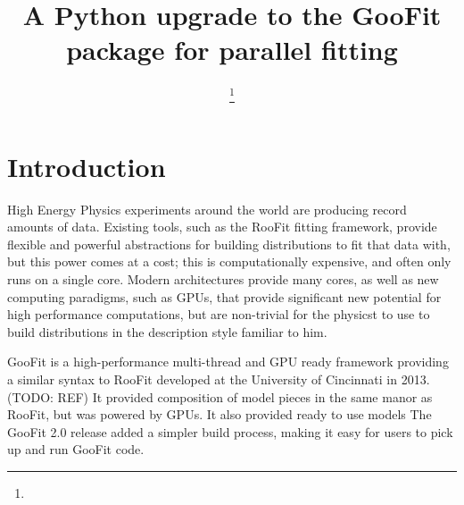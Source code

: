 \documentclass{webofc}
\begin{document}
%
\title{A Python upgrade to the GooFit package for parallel fitting}

\author{
        \fnsep\thanks{}
        \and
        \and 
        \and
        \and 
        \and 
}        %


%
\maketitle
%
\section{Introduction}
\label{intro}
High Energy Physics experiments around the world are producing record amounts of data. Existing tools, such as the RooFit fitting framework, provide flexible and powerful abstractions for building distributions to fit that data with, but this power comes at a cost; this is computationally expensive, and often only runs on a single core. Modern architectures provide many cores, as well as new computing paradigms, such as GPUs, that provide significant new potential for high performance computations, but are non-trivial for the physicst to use to build distributions in the description style familiar to him.

GooFit is a high-performance multi-thread and GPU ready framework providing a similar syntax to RooFit developed at the University of Cincinnati in 2013. (TODO: REF) It provided composition of model pieces in the same manor as RooFit, but was powered by GPUs. It also provided ready to use models The GooFit 2.0 release added a simpler build process, making it easy for users to pick up and run GooFit code.
\end{document}
